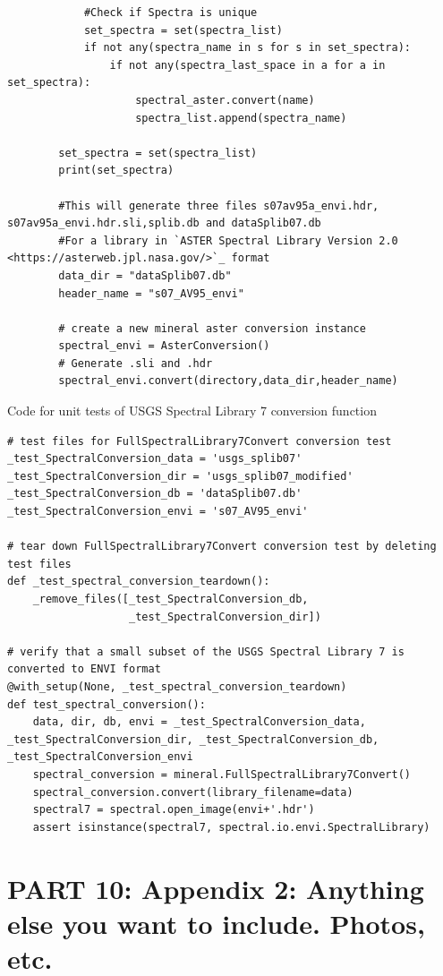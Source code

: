 \documentclass[onecolumn, draftclsnofoot,10pt, compsoc]{IEEEtran}
\begin{document}
\begin{lstlisting}
            #Check if Spectra is unique
            set_spectra = set(spectra_list)
            if not any(spectra_name in s for s in set_spectra):
                if not any(spectra_last_space in a for a in set_spectra):
                    spectral_aster.convert(name)
                    spectra_list.append(spectra_name)

        set_spectra = set(spectra_list)
        print(set_spectra)

        #This will generate three files s07av95a_envi.hdr, s07av95a_envi.hdr.sli,splib.db and dataSplib07.db
        #For a library in `ASTER Spectral Library Version 2.0 <https://asterweb.jpl.nasa.gov/>`_ format
        data_dir = "dataSplib07.db"
        header_name = "s07_AV95_envi"

        # create a new mineral aster conversion instance
        spectral_envi = AsterConversion()
        # Generate .sli and .hdr
        spectral_envi.convert(directory,data_dir,header_name)
\end{lstlisting}
Code for unit tests of USGS Spectral Library 7 conversion function
\newline
\begin{lstlisting}
# test files for FullSpectralLibrary7Convert conversion test
_test_SpectralConversion_data = 'usgs_splib07'
_test_SpectralConversion_dir = 'usgs_splib07_modified'
_test_SpectralConversion_db = 'dataSplib07.db'
_test_SpectralConversion_envi = 's07_AV95_envi'

# tear down FullSpectralLibrary7Convert conversion test by deleting test files
def _test_spectral_conversion_teardown():
    _remove_files([_test_SpectralConversion_db,
                   _test_SpectralConversion_dir])

# verify that a small subset of the USGS Spectral Library 7 is converted to ENVI format
@with_setup(None, _test_spectral_conversion_teardown)
def test_spectral_conversion():
    data, dir, db, envi = _test_SpectralConversion_data, _test_SpectralConversion_dir, _test_SpectralConversion_db, _test_SpectralConversion_envi
    spectral_conversion = mineral.FullSpectralLibrary7Convert()
    spectral_conversion.convert(library_filename=data)
    spectral7 = spectral.open_image(envi+'.hdr')
    assert isinstance(spectral7, spectral.io.envi.SpectralLibrary)
\end{lstlisting}

\section{PART 10: Appendix 2: Anything else you want to include. Photos, etc.}
\end{document}
